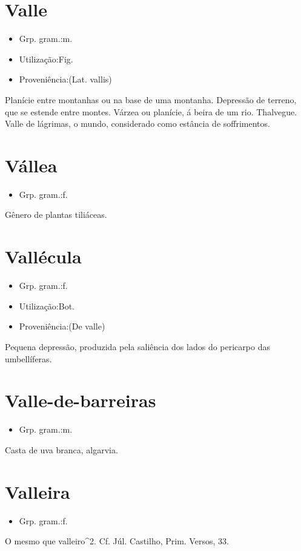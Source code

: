 \documentclass{article}
\begin{document}
\section{Valle}
\begin{itemize}
\item {Grp. gram.:m.}
\end{itemize}
\begin{itemize}
\item {Utilização:Fig.}
\end{itemize}
\begin{itemize}
\item {Proveniência:(Lat. \textunderscore vallis\textunderscore )}
\end{itemize}
Planície entre montanhas ou na base de uma montanha.
Depressão de terreno, que se estende entre montes.
Várzea ou planície, á beira de um rio.
Thalvegue.
\textunderscore Valle de lágrimas\textunderscore , o mundo, considerado como estância de soffrimentos.
\section{Vállea}
\begin{itemize}
\item {Grp. gram.:f.}
\end{itemize}
Gênero de plantas tiliáceas.
\section{Vallécula}
\begin{itemize}
\item {Grp. gram.:f.}
\end{itemize}
\begin{itemize}
\item {Utilização:Bot.}
\end{itemize}
\begin{itemize}
\item {Proveniência:(De \textunderscore valle\textunderscore )}
\end{itemize}
Pequena depressão, produzida pela saliência dos lados do pericarpo das umbellíferas.
\section{Valle-de-barreiras}
\begin{itemize}
\item {Grp. gram.:m.}
\end{itemize}
Casta de uva branca, algarvia.
\section{Valleira}
\begin{itemize}
\item {Grp. gram.:f.}
\end{itemize}
O mesmo que \textunderscore valleiro\textunderscore ^2. Cf. Júl. Castilho, \textunderscore Prim. Versos\textunderscore , 33.
\end{document}
